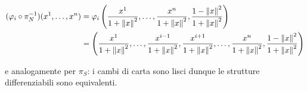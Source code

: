 {\begin{align}
	\begin{split}
		(\varphi_{i} \circ \pi_{N}^{-1})(x^{1},\dots,x^{n}) &= \varphi_{i} \left( \dfrac{x^{1}}{1 + \norm{x}^{2}}, \dots, \dfrac{x^{n}}{1 + \norm{x}^{2}}, \dfrac{1 - \norm{x}^{2}}{1 + \norm{x}^{2}} \right) \\
		&= \left( \dfrac{x^{1}}{1 + \norm{x}^{2}}, \dots, \dfrac{x^{i-1}}{1 + \norm{x}^{2}}, \dfrac{x^{i+1}}{1 + \norm{x}^{2}}, \dots, \dfrac{x^{n}}{1 + \norm{x}^{2}}, \dfrac{1 - \norm{x}^{2}}{1 + \norm{x}^{2}} \right)
	\end{split}
\end{align}

e analogamente per $ \pi_{S} $: i cambi di carta sono lisci dunque le strutture differenziabili sono equivalenti.
}


